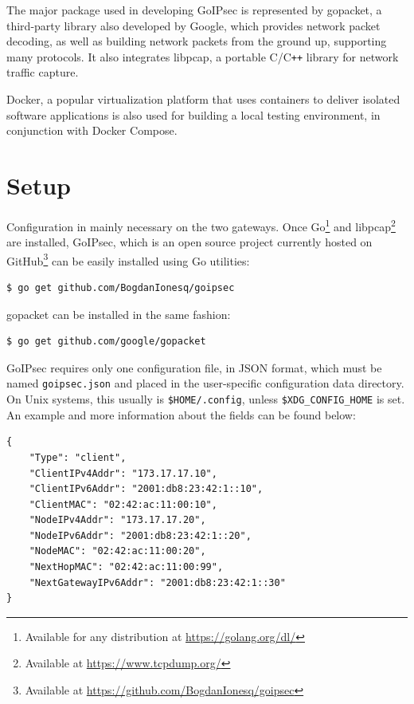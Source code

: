 \documentclass[a4paper,12pt]{report}
\begin{document}
		The major package used in developing GoIPsec is represented by gopacket, a third-party library also developed by Google, which provides network packet decoding, as well as building network packets from the ground up, supporting many protocols. It also integrates libpcap, a portable C/C\texttt{++} library for network traffic capture.
		
		Docker, a popular virtualization platform that uses containers to deliver isolated software applications is also used for building a local testing environment, in conjunction with Docker Compose.
		
		\section{Setup}
		Configuration in mainly necessary on the two gateways. Once Go\footnote{Available for any distribution at \url{https://golang.org/dl/}} and libpcap\footnote{Available at \url{https://www.tcpdump.org/}} are installed, GoIPsec, which is an open source project currently hosted on GitHub\footnote{Available at \url{https://github.com/BogdanIonesq/goipsec}} can be easily installed using Go utilities:
		\begin{lstlisting}[caption=Installing GoIPsec.]
$ go get github.com/BogdanIonesq/goipsec
		\end{lstlisting}
		gopacket can be installed in the same fashion:
		\begin{lstlisting}[caption=Installing gopacket library.]
$ go get github.com/google/gopacket
		\end{lstlisting}
		GoIPsec requires only one configuration file, in JSON format, which must be named \texttt{goipsec.json} and placed in the user-specific configuration data directory. On Unix systems, this usually is \texttt{\$HOME/.config}, unless \texttt{\$XDG\_CONFIG\_HOME} is set. An example and more information about the fields can be found below:
				\begin{lstlisting}[caption=Example of GoIPsec client-side configuration file.]
{
	"Type": "client",
	"ClientIPv4Addr": "173.17.17.10",
	"ClientIPv6Addr": "2001:db8:23:42:1::10",
	"ClientMAC": "02:42:ac:11:00:10",
	"NodeIPv4Addr": "173.17.17.20",
	"NodeIPv6Addr": "2001:db8:23:42:1::20",
	"NodeMAC": "02:42:ac:11:00:20",
	"NextHopMAC": "02:42:ac:11:00:99",
	"NextGatewayIPv6Addr": "2001:db8:23:42:1::30"
}
		\end{lstlisting}
\end{document}

